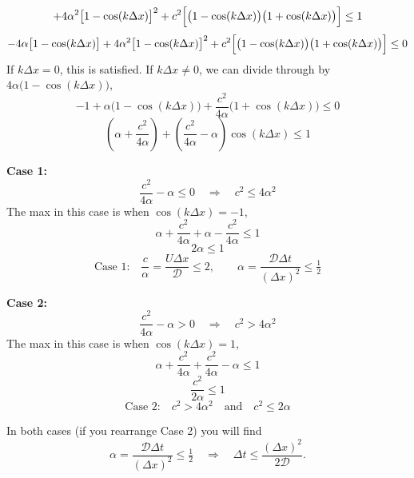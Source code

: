 \begin{solution}
\[        + 4\alpha^2\bigl[1 - \cos(k\Delta x)\bigr]^2
        + c^2\Bigl[\bigl(1-\cos(k\Delta x)\bigr)\bigl(1+\cos(k\Delta x)\bigr)\Bigr] \le 1
    \]
    \[
        - 4\alpha\bigl[1 - \cos(k\Delta x)\bigr]
        + 4\alpha^2\bigl[1 - \cos(k\Delta x)\bigr]^2
        + c^2\Bigl[\bigl(1-\cos(k\Delta x)\bigr)\bigl(1+\cos(k\Delta x)\bigr)\Bigr] \le 0
    \]
    If $k\Delta x = 0$, this is satisfied. If $k\Delta x \ne 0$, we can divide through
    by $4\alpha\bigl(1 - \cos(k\Delta x)\bigr)$,
    \[
        -1 + \alpha\bigl(1 - \cos(k\Delta x)\bigr)
        + \frac{c^2}{4\alpha}\bigl(1 + \cos(k\Delta x)\bigr) \le 0
    \]
    \[
        \boxed{\;\left(\alpha + \frac{c^2}{4\alpha}\right)
        + \left(\frac{c^2}{4\alpha} - \alpha\right)\cos(k\Delta x) \le 1\;}
    \]

    \noindent\textbf{Case 1:}
    \[
        \frac{c^2}{4\alpha} - \alpha \le 0
        \quad\Longrightarrow\quad
        c^2 \le 4\alpha^2
    \]
    The max in this case is when $\cos(k\Delta x) = -1$,
    \[
        \alpha + \frac{c^2}{4\alpha} + \alpha - \frac{c^2}{4\alpha} \le 1
    \]
    \[
        2\alpha \le 1
    \]
    \[
        \boxed{\;\text{Case 1:}\quad
        \frac{c}{\alpha} = \frac{U\Delta x}{\mathcal{D}} \le 2,
        \qquad
        \alpha = \frac{\mathcal{D}\Delta t}{(\Delta x)^2} \le \tfrac{1}{2}\;}
    \]

    \noindent\textbf{Case 2:}
    \[
        \frac{c^2}{4\alpha} - \alpha > 0
        \quad\Longrightarrow\quad
        c^2 > 4\alpha^2
    \]
    The max in this case is when $\cos(k\Delta x) = 1$,
    \[
        \alpha + \frac{c^2}{4\alpha} + \frac{c^2}{4\alpha} - \alpha \le 1
    \]
    \[
        \frac{c^2}{2\alpha} \le 1
    \]
    \[
        \boxed{\;\text{Case 2:}\quad
        c^2 > 4\alpha^2
        \quad\text{and}\quad
        c^2 \le 2\alpha\;}
    \]

    In both cases (if you rearrange Case 2) you will find
    \[
        \alpha = \frac{\mathcal{D}\Delta t}{(\Delta x)^2} \le \tfrac{1}{2}
        \quad\Longrightarrow\quad
        \Delta t \le \frac{(\Delta x)^2}{2\mathcal{D}}.
    \]
\end{solution}

